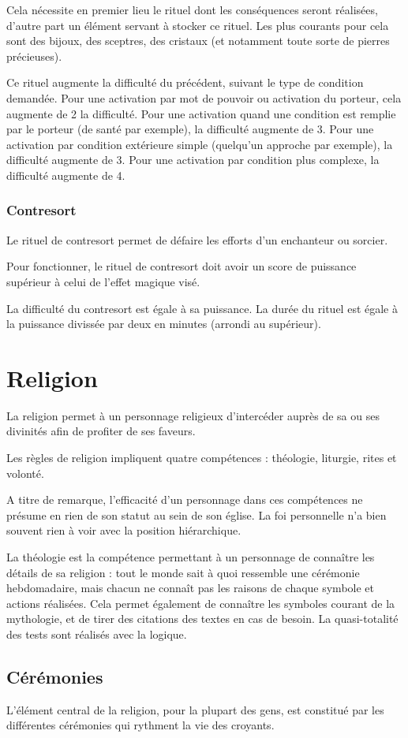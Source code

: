 \documentclass[10pt,a4paper,twocolumn]{book}
\begin{document}
Cela nécessite en premier lieu le rituel dont les conséquences seront réalisées, d'autre part un élément servant à stocker ce rituel. Les plus courants pour cela sont des bijoux, des sceptres, des cristaux (et notamment toute sorte de pierres précieuses).

Ce rituel augmente la difficulté du précédent, suivant le type de condition demandée. Pour une activation par mot de pouvoir ou activation du porteur, cela augmente de 2 la difficulté. Pour une activation quand une condition est remplie par le porteur (de santé par exemple), la difficulté augmente de 3. Pour une activation par condition extérieure simple (quelqu'un approche par exemple), la difficulté augmente de 3. Pour une activation par condition plus complexe, la difficulté augmente de 4.
\subsubsection{Contresort}
Le rituel de contresort permet de défaire les efforts d'un enchanteur ou sorcier.

Pour fonctionner, le rituel de contresort doit avoir un score de puissance supérieur à celui de l'effet magique visé.

La difficulté du contresort est égale à sa puissance. La durée du rituel est égale à la puissance divissée par deux en minutes (arrondi au supérieur).
\section{Religion}
La religion permet à un personnage religieux d'intercéder auprès de sa ou ses divinités afin de profiter de ses faveurs.

Les règles de religion impliquent quatre compétences : théologie, liturgie, rites et volonté.

A titre de remarque, l'efficacité d'un personnage dans ces compétences ne présume en rien de son statut au sein de son église. La foi personnelle n'a bien souvent rien à voir avec la position hiérarchique. 

La théologie est la compétence permettant à un personnage de connaître les détails de sa religion : tout le monde sait à quoi ressemble une cérémonie hebdomadaire, mais chacun ne connaît pas les raisons de chaque symbole et actions réalisées. Cela permet également de connaître les symboles courant de la mythologie, et de tirer des citations des textes en cas de besoin. La quasi-totalité des tests sont réalisés avec la logique.
\subsection{Cérémonies}
L'élément central de la religion, pour la plupart des gens, est constitué par les différentes cérémonies qui rythment la vie des croyants.
\end{document}
